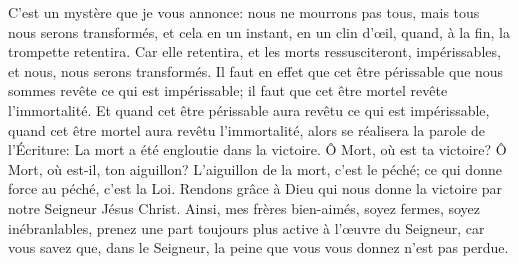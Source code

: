 C’est un mystère que je vous annonce:
	nous ne mourrons pas tous, mais tous nous serons transformés,
	et cela en un instant, en un clin d’œil,
	quand, à la fin, la trompette retentira.
Car elle retentira, et les morts ressusciteront, impérissables,
	et nous, nous serons transformés.
Il faut en effet que cet être périssable que nous sommes
	revête ce qui est impérissable;
	il faut que cet être mortel revête l’immortalité.
Et quand cet être périssable aura revêtu ce qui est impérissable,
	quand cet être mortel aura revêtu l’immortalité,
	alors se réalisera la parole de l’Écriture:
	La mort a été engloutie dans la victoire.
Ô Mort, où est ta victoire?
Ô Mort, où est-il, ton aiguillon?
L’aiguillon de la mort, c’est le péché;
	ce qui donne force au péché, c’est la Loi.
Rendons grâce à Dieu qui nous donne la victoire par notre Seigneur Jésus Christ.
Ainsi, mes frères bien-aimés, soyez fermes, soyez inébranlables,
	prenez une part toujours plus active à l’œuvre du Seigneur,
	car vous savez que, dans le Seigneur,
		la peine que vous vous donnez n’est pas perdue.
